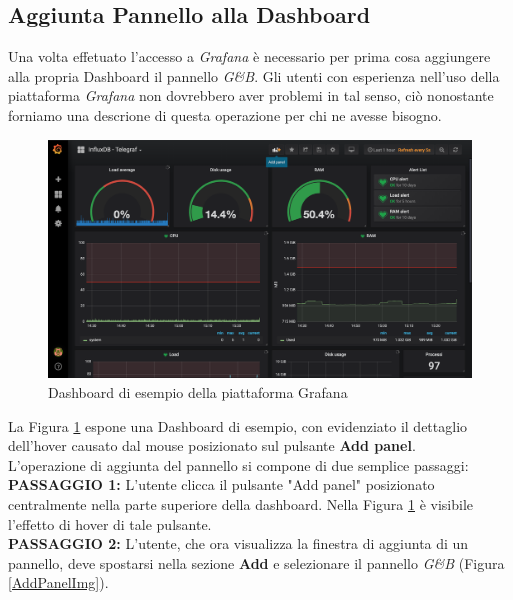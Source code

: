 \subsection{Aggiunta Pannello alla Dashboard}\label{AddPanel}

Una volta effetuato l'accesso a \textit{Grafana} è necessario per prima cosa aggiungere alla propria Dashboard il pannello \textit{G\&B}. Gli utenti con esperienza nell'uso della piattaforma \textit{Grafana} non dovrebbero aver problemi in tal senso, ciò nonostante forniamo una descrione di questa operazione per chi ne avesse bisogno.\\

\begin{figure}[H]
	\begin{center}
		\includegraphics[scale=0.33]{./images/Dashboard.png}
		 \caption{Dashboard di esempio della piattaforma Grafana}	
		 \label{Dashboard}
	\end{center}
\end{figure}

La Figura \ref{Dashboard} espone una Dashboard di esempio, con evidenziato il dettaglio dell'hover causato dal mouse posizionato sul pulsante \textbf{Add panel}.\\
L'operazione di aggiunta del pannello si compone di due semplice passaggi:
~\\

\textbf{PASSAGGIO 1:} L'utente clicca il pulsante "Add panel" posizionato centralmente nella parte superiore della dashboard. Nella Figura \ref{Dashboard} è visibile l'effetto di hover di tale pulsante.
~\\

\textbf{PASSAGGIO 2:} L'utente,  che ora visualizza la finestra di aggiunta di un pannello, deve spostarsi nella sezione \textbf{Add} e selezionare il pannello \textit{G\&B} (Figura \ref{AddPanelImg}).

